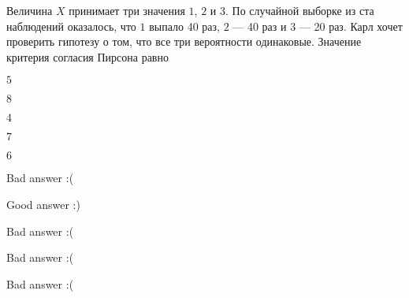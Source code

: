 
\begin{question}
Величина \(X\) принимает три значения \(1\), \(2\) и \(3\). По случайной
выборке из ста наблюдений оказалось, что \(1\) выпало 40 раз, \(2\) ---
40 раз и \(3\) --- 20 раз. Карл хочет проверить гипотезу о том, что все
три вероятности одинаковые. Значение критерия согласия Пирсона равно
\begin{answerlist}
  \item \(5\)
  \item \(8\)
  \item \(4\)
  \item \(7\)
  \item \(6\)
\end{answerlist}
\end{question}

\begin{solution}
\begin{answerlist}
  \item Bad answer :(
  \item Good answer :)
  \item Bad answer :(
  \item Bad answer :(
  \item Bad answer :(
\end{answerlist}
\end{solution}

